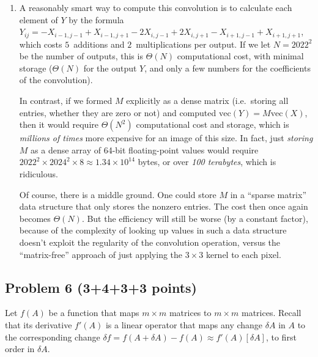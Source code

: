 \documentclass[10pt,oneside]{article}
\begin{document}
\begin{enumerate}
\item A reasonably smart way to compute this convolution is to calculate each element of $Y$ by the formula $Y_{ij} = -X_{i-1,j-1} + X_{i-1,j+1} - 2X_{i,j-1} + 2X_{i,j+1} -X_{i+1,j-1} + X_{i+1,j+1}$, which costs $5$~additions and $2$~multiplications per output.  If we let $N = 2022^2$ be the number of outputs, this is $\Theta(N)$ computational cost, with minimal storage ($\Theta(N)$ for the output $Y$, and only a few numbers for the coefficients of the convolution).

In contrast, if we formed $M$ explicitly as a dense matrix (i.e.~storing all entries, whether they are zero or not) and computed $\mathrm{vec}(Y) = M \mathrm{vec}(X)$, then it would require $\Theta(N^2)$ computational cost and storage, which is \emph{millions of times} more expensive for an image of this size.  In fact, just \emph{storing} $M$ as a dense array of 64-bit floating-point values would require $2022^2 \times 2024^2 \times 8 \approx 1.34 \times 10^{14}$ bytes, or over \emph{100 terabytes}, which is ridiculous.

Of course, there is a middle ground.  One could store $M$ in a ``sparse matrix'' data structure that only stores the nonzero entries.  The cost then once again becomes $\Theta(N)$.  But the efficiency will still be worse (by a constant factor), because of the complexity of looking up values in such a data structure doesn't exploit the regularity of the convolution operation, versus the ``matrix-free'' approach of just applying the $3 \times 3$ kernel to each pixel.
    
\end{enumerate}

 
\subsection*{Problem 6 (3+4+3+3 points)}

Let $f(A)$ be a function that maps $m \times m$ matrices to $m \times m$ matrices.  Recall that its derivative $f'(A)$ is a linear operator that maps any change $\delta A$ in $A$ to the corresponding change $\delta f = f(A+\delta A) - f(A) \approx f'(A)[\delta A]$, to first order in $\delta A$.
\end{document}
